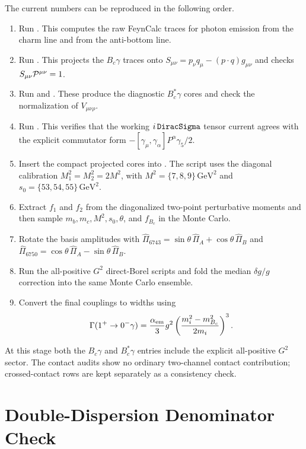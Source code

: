 \documentclass[11pt]{article}
\newcommand{\Bc}{B_c}
\newcommand{\GeV}{\mathrm{GeV}}
\begin{document}
The current numbers can be reproduced in the following order.
\begin{enumerate}
  \item Run .  This
  computes the raw FeynCalc traces for photon emission from the charm line and
  from the anti-bottom line.
  \item Run .  This
  projects the \(B_c\gamma\) traces onto
  \(S_{\mu\nu}=p_\nu q_\mu-(p\cdot q)g_{\mu\nu}\) and checks
  \(S_{\mu\nu}{\cal P}^{\mu\nu}=1\).
  \item Run  and
  .  These produce the
  diagnostic \(B_c^\ast\gamma\) cores and check the normalization of
  \(V_{\mu\nu\rho}\).
  \item Run .
  This verifies that the working \(i\,{\tt DiracSigma}\) tensor current agrees
  with the explicit commutator form
  \(-[\gamma_\mu,\gamma_\alpha]P^\alpha\gamma_5/2\).
  \item Insert the compact projected cores into
  .  The script uses the
  diagonal calibration \(M_1^2=M_2^2=2M^2\), with
  \(M^2=\{7,8,9\}\,\GeV^2\) and \(s_0=\{53,54,55\}\,\GeV^2\).
  \item Extract \(f_1\) and \(f_2\) from the diagonalized two-point
  perturbative moments and then sample \(m_b,m_c,M^2,s_0,\theta\), and
  \(f_{B_c}\) in the Monte Carlo.
  \item Rotate the basis amplitudes with
  \(\widehat\Pi_{6743}=\sin\theta\,\widehat\Pi_A+\cos\theta\,\widehat\Pi_B\)
  and
  \(\widehat\Pi_{6750}=\cos\theta\,\widehat\Pi_A-\sin\theta\,\widehat\Pi_B\).
  \item Run the all-positive \(G^2\) direct-Borel scripts and fold the median
  \(\delta g/g\) correction into the same Monte Carlo ensemble.
  \item Convert the final couplings to widths using
  \[
  \Gamma(1^+\to0^-\gamma)=
  \frac{\alpha_{\rm em}}{3}g^2
  \left(\frac{m_i^2-m_{\Bc}^2}{2m_i}\right)^3 .
  \]
\end{enumerate}
At this stage both the \(B_c\gamma\) and \(B_c^\ast\gamma\) entries include the
explicit all-positive \(G^2\) sector.  The contact audits show no ordinary
two-channel contact contribution; crossed-contact rows are kept separately as a
consistency check.

\section{Double-Dispersion Denominator Check}
\end{document}
